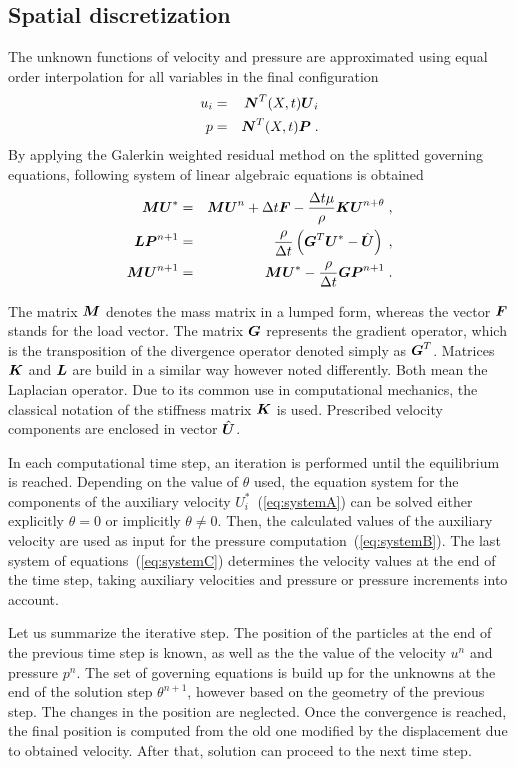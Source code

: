 \subsection{Spatial discretization}
The unknown functions of velocity and pressure are approximated using equal order interpolation for all variables in the final configuration
\begin{eqnarray}
u_i&=&\mbox{\boldmath$N$}^T(X,t)\mbox{\boldmath$U$}_i\\
p&=&\mbox{\boldmath$N$}^T(X,t)\mbox{\boldmath$P$} \;.
\end{eqnarray}
By applying the Galerkin weighted residual method on the splitted governing equations, following system of linear algebraic equations is obtained 
\begin{eqnarray}
\mbox{\boldmath$M$}\mbox{\boldmath$U$}^* &=& \mbox{\boldmath$M$}\mbox{\boldmath$U$}^n + \Delta t\mbox{\boldmath$F$} - \frac{\Delta t\mu}{\rho}\mbox{\boldmath$K$}\mbox{\boldmath$U$}^{n+\theta}\;,\label{eq:systemA} \\
\mbox{\boldmath$L$}\mbox{\boldmath$P$}^{n+1} &=&\frac{\rho}{\Delta t}\left(\mbox{\boldmath$G$}^T\mbox{\boldmath$U$}^*-\hat{\mbox{\boldmath$U$}}\right) \;, \label{eq:systemB} \\
\mbox{\boldmath$M$}\mbox{\boldmath$U$}^{n+1} &=& \mbox{\boldmath$M$}\mbox{\boldmath$U$}^* - \frac{\rho}{\Delta t}\mbox{\boldmath$G$}\mbox{\boldmath$P$}^{n+1} \;.\label{eq:systemC}
\end{eqnarray}
\par
The matrix $\mbox{\boldmath$M$}$ denotes the mass matrix in a lumped form, whereas the vector $\mbox{\boldmath$F$}$ stands for the load vector. The matrix $\mbox{\boldmath$G$}$ represents the gradient operator, which is the transposition of the divergence operator denoted simply as $\mbox{\boldmath$G$}^T$. Matrices $\mbox{\boldmath$K$}$ and $\mbox{\boldmath$L$}$ are build in a similar way however noted differently. Both mean the Laplacian operator. Due to its common use in computational mechanics, the classical notation of the stiffness matrix $\mbox{\boldmath$K$}$ is used. Prescribed velocity components are enclosed in vector $\hat{\mbox{\boldmath$U$}}$.
\par
In each computational time step, an iteration is performed until the equilibrium is reached. Depending on the value of $\theta$ used, the equation system for the components of the auxiliary velocity $U^*_i$~(\ref{eq:systemA}) can be solved either explicitly $\theta = 0$ or implicitly $\theta \neq 0$. Then, the calculated values of the auxiliary velocity are used as input for the pressure computation~(\ref{eq:systemB}). The last system of equations~(\ref{eq:systemC}) determines the velocity values at the end of the time step, taking auxiliary velocities and pressure or pressure increments into account.
\par
Let us summarize the iterative step. The position of the particles at the end of the previous time step is known, as well as the the value of the velocity $u^n$ and pressure $p^n$. The set of governing equations is build up for the unknowns at the end of the solution step $\theta^{n+1}$, however based on the geometry of the previous step. The changes in the position are neglected. Once the convergence is reached, the final position is computed from the old one modified by the displacement due to obtained velocity. After that, solution can proceed to the next time step.
